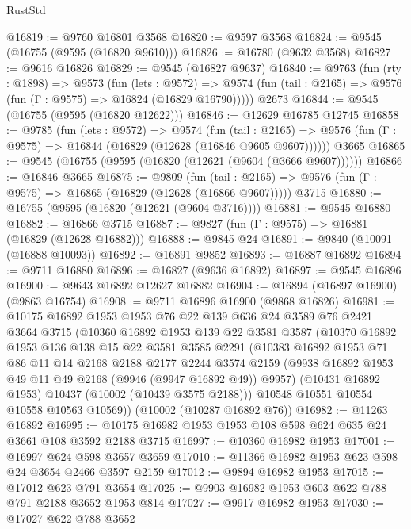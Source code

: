 \begin{lexlean}{RustStd}
\begin{coremodule}
@16819 := @9760 @16801 @3568
@16820 := @9597 @3568
@16824 := @9545 (@16755 (@9595 (@16820 @9610)))
@16826 := @16780 (@9632 @3568)
@16827 := @9616 @16826
@16829 := @9545 (@16827 @9637)
@16840 := @9763
    (fun (rty : @1898) =>
    @9573
      (fun (lets : @9572) =>
      @9574 (fun (tail : @2165) => @9576 (fun (Γ : @9575) => @16824 (@16829 @16790)))))
    @2673
@16844 := @9545 (@16755 (@9595 (@16820 @12622)))
@16846 := @12629 @16785 @12745
@16858 := @9785
    (fun (lets : @9572) =>
    @9574
      (fun (tail : @2165) =>
      @9576 (fun (Γ : @9575) => @16844 (@16829 (@12628 (@16846 @9605 @9607))))))
    @3665
@16865 := @9545 (@16755 (@9595 (@16820 (@12621 (@9604 (@3666 @9607))))))
@16866 := @16846 @3665
@16875 := @9809
    (fun (tail : @2165) => @9576 (fun (Γ : @9575) => @16865 (@16829 (@12628 (@16866 @9607)))))
    @3715
@16880 := @16755 (@9595 (@16820 (@12621 (@9604 @3716))))
@16881 := @9545 @16880
@16882 := @16866 @3715
@16887 := @9827 (fun (Γ : @9575) => @16881 (@16829 (@12628 @16882)))
@16888 := @9845 @24
@16891 := @9840 (@10091 (@16888 @10093))
@16892 := @16891 @9852
@16893 := @16887 @16892
@16894 := @9711 @16880
@16896 := @16827 (@9636 @16892)
@16897 := @9545 @16896
@16900 := @9643 @16892 @12627 @16882
@16904 := @16894 (@16897 @16900) (@9863 @16754)
@16908 := @9711 @16896 @16900 (@9868 @16826)
@16981 := @10175
    @16892
    @1953
    @1953
    @76
    @22
    @139
    @636
    @24
    @3589
    @76
    @2421
    @3664
    @3715
    (@10360
      @16892
      @1953
      @139
      @22
      @3581
      @3587
      (@10370
        @16892
        @1953
        @136
        @138
        @15
        @22
        @3581
        @3585
        @2291
        (@10383
          @16892
          @1953
          @71
          @86
          @11
          @14
          @2168
          @2188
          @2177
          @2244
          @3574
          @2159
          (@9938 @16892 @1953 @49 @11 @49 @2168 (@9946 (@9947 @16892 @49)) @9957)
          (@10431 @16892 @1953)
          @10437
          (@10002 (@10439 @3575 @2188)))
        @10548
        @10551
        @10554
        @10558
        @10563
        @10569))
    (@10002 (@10287 @16892 @76))
@16982 := @11263 @16892
@16995 := @10175 @16982 @1953 @1953 @108 @598 @624 @635 @24 @3661 @108 @3592 @2188 @3715
@16997 := @10360 @16982 @1953
@17001 := @16997 @624 @598 @3657 @3659
@17010 := @11366 @16982 @1953 @623 @598 @24 @3654 @2466 @3597 @2159
@17012 := @9894 @16982 @1953
@17015 := @17012 @623 @791 @3654
@17025 := @9903 @16982 @1953 @603 @622 @788 @791 @2188 @3652 @1953 @814
@17027 := @9917 @16982 @1953
@17030 := @17027 @622 @788 @3652

\end{coremodule}
\end{lexlean}
